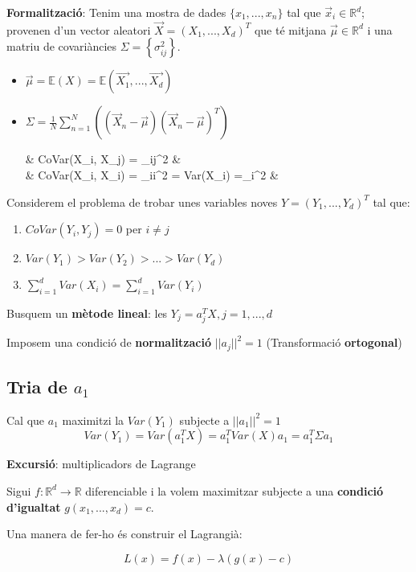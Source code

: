 \documentclass[a4paper]{article}
\begin{document}
\textbf{Formalització}: Tenim una mostra de dades $\{x_1, ..., x_n\}$ tal que $\vec{x}_i \in \mathbb{R}^d$; provenen d'un vector aleatori $\vec{X} = (X_1, ..., X_d)^T$ que té mitjana $\vec{\mu} \in \mathbb{R}^d$ i una matriu de covariàncies $\Sigma = \left\{ \sigma_{ij}^2 \right\}$.

\begin{itemize}
	\item $\vec{\mu} = \mathbb{E}(X) = \mathbb{E}(\vec{X_1}, ..., \vec{X_d})$
	\item $\Sigma = \frac{1}{N} \sum_{n=1}^N \left((\vec{X}_n - \vec{\mu})(\vec{X}_n - \vec{\mu})^T\right)$
	
	\begin{flalign*}
	 & CoVar(X_i, X_j) = \sigma_{ij}^2  &\\
 & CoVar(X_i, X_i) = \sigma_{ii}^2 = Var(X_i) =\sigma_i^2 &
	\end{flalign*}
\end{itemize}

Considerem el problema de trobar unes variables noves $Y = (Y_1, ..., Y_d)^T$ tal que:

\begin{enumerate}
	\item $CoVar(Y_i, Y_j) = 0$ per $i \ne j$
	\item $Var(Y_1) > Var(Y_2) > ... > Var(Y_d)$
	\item $\sum_{i=1}^d Var(X_i) = \sum_{i=1}^d Var(Y_i)$
\end{enumerate}

Busquem un \textbf{mètode lineal}: les $Y_j = a_j^TX, j=1,...,d$

Imposem una condició de \textbf{normalització} $||a_j||^2 = 1$ 
(Transformació \textbf{ortogonal})

\subsection{Tria de $a_1$}
Cal que $a_1$ maximitzi la $Var(Y_1)$ subjecte a $||a_1||^2=1$
$$ Var(Y_1) = Var(a_1^TX) = a_1^TVar(X)a_1 = a_1^T\Sigma a_1 $$

\textbf{Excursió}: multiplicadors de Lagrange

Sigui $f:\mathbb{R}^d \rightarrow \mathbb{R}$ diferenciable i la volem maximitzar subjecte a una \textbf{condició d'igualtat} $g(x_1, ..., x_d) = c$.

Una manera de fer-ho és construir el Lagrangià:

$$  L(x) = f(x) - \lambda(g(x) - c)  $$
\end{document}
